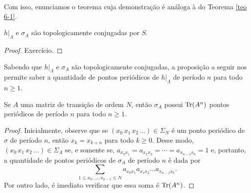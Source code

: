 Com isso, enunciamos o teorema cuja demonstração é análoga à do Teorema \ref{teo 6-1}.

\begin{theorem}
$h|_\Lambda$ e $\sigma_A$ são topologicamente conjugadas por $S$.
\end{theorem}

\begin{proof}
Exercício.
\end{proof}

Sabendo que $h|_\Lambda$ e $\sigma_A$ são topologicamente conjugadas, a proposição a seguir nos permite saber a quantidade de pontos periódicos de $h|_\Lambda$ de período $n$ para todo $n \geq 1$.

\begin{proposition}
Se $A$ uma matriz de transição de ordem $N$, então $\sigma_A$ possui $\operatorname{Tr}(A^n)$ pontos periódicos de período $n$ para todo $n \geq 1$.
\end{proposition}


\begin{proof}
Inicialmente, observe que se $(x_0 \, x_1 \, x_2 \, \dots) \in \Sigma_N$ é um ponto periódico de $\sigma$ de período $n$, então $x_k = x_{k+n}$ para todo $k \geq 0$.
Desse modo, $(x_0 \, x_1 \, x_2 \, \dots) \in \Sigma_A$ se, e somente se, $a_{x_0 x_1} = a_{x_1 x_2} = \cdots = a_{x_{n-1} x_0} = 1$ e, portanto, a quantidade de pontos periódicos de $\sigma_A$ de período $n$ é dada por
$$\sum_{1 \leq x_0, \dots, x_{n-1} \leq N} a_{x_0 x_1} a_{x_1 x_2}  \dots a_{x_{n-1} x_0}.$$
Por outro lado, é imediato verificar que essa soma é $\operatorname{Tr}(A^n)$.
\end{proof}
